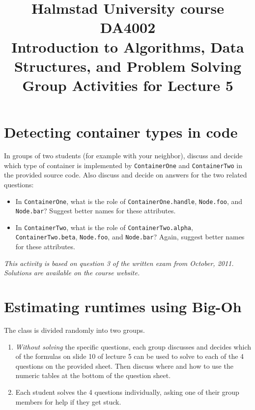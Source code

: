 \documentclass[a4paper]{article}
\begin{document}
\title{
  {\small
    Halmstad University course DA4002\\
    Introduction to Algorithms, Data Structures, and Problem Solving\\
  }
  Group Activities for Lecture 5
}
\maketitle



\section{Detecting container types in code}

In groups of two students (for example with your neighbor), discuss and decide which type of container is implemented by \texttt{ContainerOne} and \texttt{ContainerTwo} in the provided source code.
Also discuss and decide on answers for the two related questions:
\begin{itemize}
\item
  In \texttt{ContainerOne}, what is the role of \texttt{ContainerOne.handle}, \texttt{Node.foo}, and \texttt{Node.bar}?
  Suggest better names for these attributes.
\item
  In \texttt{ContainerTwo}, what is the role of \texttt{ContainerTwo.alpha}, \texttt{ContainerTwo.beta}, \texttt{Node.foo}, and \texttt{Node.bar}?
  Again, suggest better names for these attributes.
\end{itemize}

\emph{
  This activity is based on question 3 of the written exam from October, 2011.
  Solutions are available on the course website.
}



\section{Estimating runtimes using Big-Oh}

The class is divided randomly into two groups.

\begin{enumerate}

\item
  \emph{Without solving} the specific questions, each group discusses and decides which of the formulas on slide 10 of lecture 5 can be used to solve to each of the 4 questions on the provided sheet.
  Then discuss where and how to use the numeric tables at the bottom of the question sheet.

\item
  Each student solves the 4 questions individually, asking one of their group members for help if they get stuck.


\end{enumerate}
\end{document}
